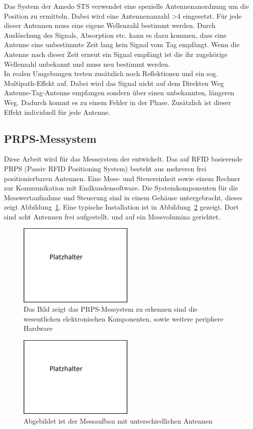 %
Das System der Amedo STS verwendet eine spezielle Antennenanordnung um die Position zu ermitteln. Dabei wird eine Antennenanzahl >4 eingesetzt. Für jede dieser Antennen muss eine eigene Wellenzahl bestimmt werden. Durch Auslöschung des Signals, Absorption etc. kann es dazu kommen, dass eine Antenne eine unbestimmte Zeit lang kein Signal vom Tag empfängt. Wenn die Antenne nach dieser Zeit erneut ein Signal empfängt ist die ihr zugehörige Wellenzahl unbekannt und muss neu bestimmt werden. \\
In realen Umgebungen treten zusätzlich noch Reflektionen und ein sog. Multipath-Effekt auf. Dabei wird das Signal nicht auf dem Direkten Weg Antenne-Tag-Antenne empfangen sondern über einen unbekannten, längeren Weg. Dadurch kommt es zu einem Fehler in der Phase. Zusätzlich ist dieser Effekt individuell für jede Antenne.
%

\subsection{PRPS-Messystem}
%
Diese Arbeit wird für das Messsystem der \amedogmbh entwickelt. Das auf RFID basierende PRPS (Passiv RFID Positioning System) besteht aus mehreren frei positionierbaren Antennen. Eine Mess- und Steuereinheit sowie einem Rechner zur Kommunikation mit Endkundensoftware. Die Systemkomponenten für die Messwertaufnahme und Steuerung sind in einem Gehäuse untergebracht, dieses zeigt Abbildung~\ref{fig:System}. Eine typische Installation ist in Abbildung~\ref{fig:Setup} gezeigt. Dort sind acht Antennen frei aufgestellt. und auf ein Messvolumina gerichtet.
%
\begin{figure}[h]
         \centering
         \includegraphics[width=0.5\textwidth]{img/00_placeholder.png}
         \caption[Messystem der Amedo GmbH]{Das Bild zeigt das PRPS-Messystem zu erkennen sind die wesentlichen elektronischen Komponenten, sowie weitere periphere Hardware }
         \label{fig:System}
\end{figure}
%
\begin{figure}[h]
         \centering
         \includegraphics[width=0.5\textwidth]{img/00_placeholder.png}
         \caption[Messaufbau der Amedo GmbH]{Abgebildet ist der Messaufbau mit unterschiedlichen Antennen}
         \label{fig:Setup}
\end{figure}